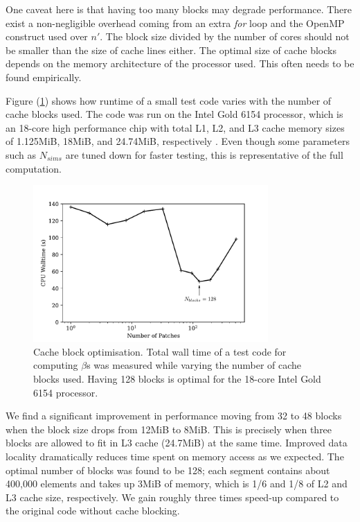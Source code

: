 One caveat here is that having too many blocks may degrade performance. There exist a non-negligible overhead coming from an extra \textit{for} loop and the OpenMP construct used over $n'$. The block size divided by the number of cores should not be smaller than the size of cache lines either. The optimal size of cache blocks depends on the memory architecture of the processor used. This often needs to be found empirically.

Figure (\ref{fig:cache_block_optimisation}) shows how runtime of a small test code varies with the number of cache blocks used. The code was run on the Intel Gold 6154 processor, which is an 18-core high performance chip with total L1, L2, and L3 cache memory sizes of 1.125MiB, 18MiB, and 24.74MiB, respectively \cite{intel_data_sheet}. Even though some parameters such as $N_{sims}$ are tuned down for faster testing, this is representative of the full computation.

\begin{figure}[htbp!] 
	\centering    
	\includegraphics[width=0.8\textwidth]{cache_block_optimisation_annotated.pdf}
	\caption[Cache block optimisation]{Cache block optimisation. Total wall time of a test code for computing $\beta$s was measured while varying the number of cache blocks used. Having 128 blocks is optimal for the 18-core Intel Gold 6154 processor.}
	\label{fig:cache_block_optimisation}
\end{figure}

We find a significant improvement in performance moving from 32 to 48 blocks when the block size drops from 12MiB to 8MiB. This is precisely when three blocks are allowed to fit in L3 cache (24.7MiB) at the same time. Improved data locality dramatically reduces time spent on memory access as we expected. The optimal number of blocks was found to be 128; each segment contains about 400,000 elements and takes up 3MiB of memory, which is 1/6 and 1/8 of L2 and L3 cache size, respectively. We gain roughly three times speed-up compared to the original code without cache blocking.

